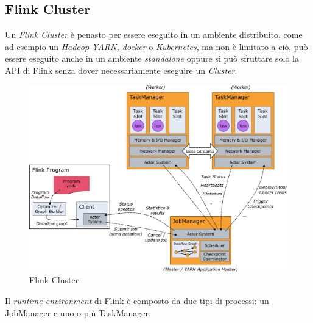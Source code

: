 \subsection{Flink Cluster}
\label{subsec:flink_cluster}
Un \textit{Flink Cluster} è penasto per essere eseguito in un ambiente distribuito, come ad esempio un \textit{Hadoop YARN, docker} o \textit{Kubernetes},
ma non è limitato a ciò, può essere eseguito anche in un ambiente \textit{standalone} oppure si può sfruttare solo la API di Flink senza dover necessariamente eseguire un \textit{Cluster}.
\begin{figure}[htbp]
    \centering
    \includegraphics[width=\textwidth]{images/flink/cluster.jpg}
    \caption{Flink Cluster}
    \label{fig:flink_cluster}
\end{figure}
Il \textit{runtime environment} di Flink è composto da due tipi di processi: un JobManager e uno o più TaskManager.
